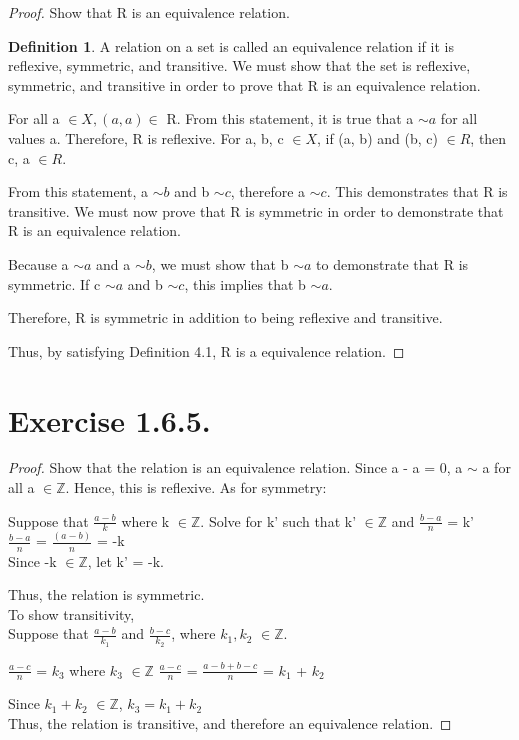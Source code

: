 \documentclass[12pt]{article}
\theoremstyle{definition}
\newtheorem{definition}[theorem]{Definition}
\numberwithin{equation}{subsection}
\begin{document}
\begin{proof} Show that R is an equivalence relation.

\begin{definition}
A relation on a set is called an equivalence relation if it is reflexive, symmetric, and transitive.
We must show that the set is reflexive, symmetric, and transitive in order to prove that R is an equivalence relation. 
\end{definition}
For all a $\in X, (a, a) \in$ R. From this statement, it is true that a $\sim a$ for all values a. Therefore, R is reflexive. For a, b, c $\in X$, if (a, b) and (b, c) $\in R$, then c, a $\in R$.

From this statement, a $\sim b$ and b $\sim c$, therefore a $\sim c$. This demonstrates that R is transitive. We must now prove that R is symmetric in order to demonstrate that R is an equivalence relation.

Because a $\sim a$ and a $\sim b$, we must show that b $\sim a$ to demonstrate that R is symmetric. If c $\sim a$ and b $\sim c$, this implies that b $\sim a$. 

Therefore, R is symmetric in addition to being reflexive and transitive.

Thus, by satisfying Definition 4.1, R is a equivalence relation.
\end{proof}
\section{Exercise 1.6.5.}
\begin{proof}
Show that the relation is an equivalence relation.
Since a - a = 0, a $\sim$ a for all a $\in \mathbb{Z}$. Hence, this is reflexive.
As for symmetry:
\begin{center}
Suppose that $\frac{a-b}{k}$ where k $\in \mathbb{Z}$. 
Solve for k' such that k' $\in \mathbb{Z}$ and
$\frac{b-a}{n}$ = k'
\\
$\frac{b-a}{n}$ = $\frac{(a-b)}{n}$ = -k
\\
Since -k $\in \mathbb{Z}$, let k' = -k.
\\
\end{center}
Thus, the relation is symmetric.
\\
To show transitivity, 
\\
Suppose that $\frac{a-b}{k_1}$ and $\frac{b-c}{k_2}$, where $k_1, k_2$ $\in \mathbb{Z}$.
\begin{center}
    $\frac{a-c}{n}$ = $k_3$ where $k_3$ $\in \mathbb{Z}$
    $\frac{a-c}{n}$ = $\frac{a-b+b-c}{n}$ = $k_1$ + $k_2$
\end{center}
Since $k_1 + k_2$ $\in \mathbb{Z}$, $k_3 = k_1 + k_2 $
\\
Thus, the relation is transitive, and therefore an equivalence relation.
\end{proof}
\end{document}
